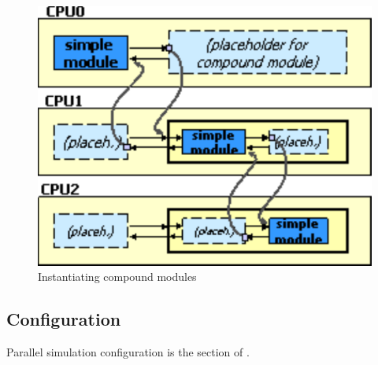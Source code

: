 \begin{figure}[htbp]
  \begin{center}
    \includegraphics{figures/placeholders2}
    \caption{Instantiating compound modules}
    \label{fig:inst}
  \end{center}
\end{figure}



\subsection{Configuration}

Parallel simulation configuration is the \ttt{[General]} section of .

